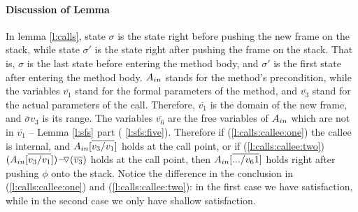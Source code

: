  

\paragraph{Discussion of Lemma} In lemma \ref{l:calls},   state $\sigma$ is the state right before pushing the new frame on the stack,   while 
state $\sigma'$ is the state right after pushing the frame on the stack.
That is, $\sigma$ is the last state before entering the method body, and $\sigma'$ is the first state after entering the method body.
$\Ain$ stands for the method's precondition, while the variables $\overline {v_1}$ stand for the formal parameters of the method,
and $\overline {v_3}$ stand for the actual parameters of the call.
Therefore, $\overline {v_1}$ is the domain of the new frame, and $\overline {\sigma} {v_3}$ is its range.
The variables $\overline {v_6}$ are the free variables of $\Ain$ which are not in  $\overline {v_1}$ -- \cf Lemma \ref{l:sfs} part
( \ref{l:sfs:five}).
Therefore if (\ref{l:calls:callee:one})  the callee is internal, and 
 $\Ain[\overline {v_3/v_1}]$ holds  at the call point, or
 if (\ref{l:calls:callee:two}) ${\PushASLong  {(\overline {v_3})} {(\Ain[\overline {v_3/v_1}])}}$
 holds  at the call point, 
 then $\Ain[\overline {.../v_61}]$  holds right after pushing $\phi$ onto the stack.
Notice the difference in the conclusion in (\ref{l:calls:callee:one}) and (\ref{l:calls:callee:two}): in the first case we have \scoped satisfaction, while in the second case we only have shallow satisfaction.

